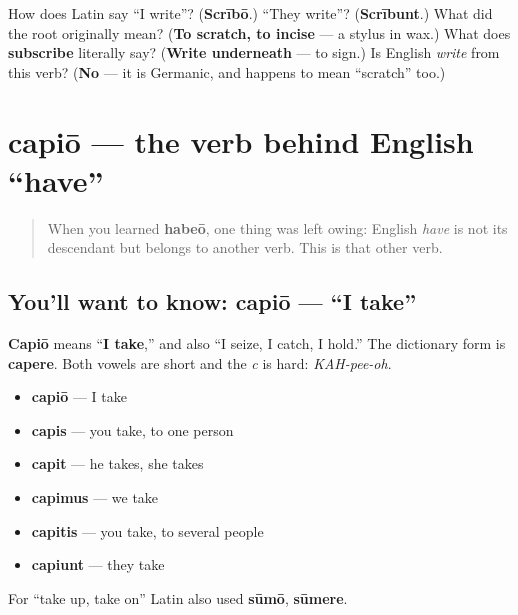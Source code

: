 \begin{tcolorbox}[breakable,colback=teal!4,colframe=teal!35!black,title={Before you move on}]
How does Latin say \textquotedblleft{}I write\textquotedblright{}? (\textbf{Scrībō}.) \textquotedblleft{}They write\textquotedblright{}? (\textbf{Scrībunt}.) What did the root originally mean? (\textbf{To scratch, to incise} — a stylus in wax.) What does \textbf{subscribe} literally say? (\textbf{Write underneath} — to sign.) Is English \emph{write} from this verb? (\textbf{No} — it is Germanic, and happens to mean \textquotedblleft{}scratch\textquotedblright{} too.)
\end{tcolorbox}
\section[capiō, capere]{capiō — the verb behind English \textquotedblleft{}have\textquotedblright{}}

\label{lesson:LA-C38-capio}



\begin{quote}
When you learned \textbf{habeō}, one thing was left owing: English \emph{have} is not its descendant but belongs to another verb. This is that other verb.
\end{quote}

\subsection*{You'll want to know: capiō — \textquotedblleft{}I take\textquotedblright{}}
\textbf{Capiō} means \textquotedblleft{}\textbf{I take},\textquotedblright{} and also \textquotedblleft{}I seize, I catch, I hold.\textquotedblright{} The dictionary form is \textbf{capere}. Both vowels are short and the \emph{c} is hard: \emph{KAH-pee-oh}.

\begin{itemize}
\raggedright
  \item \textbf{capiō} — I take
  \item \textbf{capis} — you take, to one person
  \item \textbf{capit} — he takes, she takes
  \item \textbf{capimus} — we take
  \item \textbf{capitis} — you take, to several people
  \item \textbf{capiunt} — they take
\end{itemize}

For \textquotedblleft{}take up, take on\textquotedblright{} Latin also used \textbf{sūmō}, \textbf{sūmere}.

